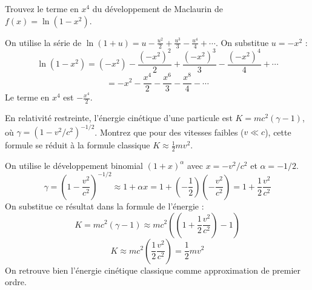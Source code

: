 \begin{exercicebox}
Trouvez le terme en $x^4$ du développement de Maclaurin de $f(x) = \ln(1-x^2)$.
\end{exercicebox}

\begin{correctionbox}
On utilise la série de $\ln(1+u) = u - \frac{u^2}{2} + \frac{u^3}{3} - \frac{u^4}{4} + \cdots$.
On substitue $u = -x^2$ :
$$ \ln(1-x^2) = (-x^2) - \frac{(-x^2)^2}{2} + \frac{(-x^2)^3}{3} - \frac{(-x^2)^4}{4} + \cdots $$
$$ = -x^2 - \frac{x^4}{2} - \frac{x^6}{3} - \frac{x^8}{4} - \cdots $$
Le terme en $x^4$ est $-\frac{x^4}{2}$.
\end{correctionbox}

\begin{exercicebox}
En relativité restreinte, l'énergie cinétique d'une particule est $K = mc^2(\gamma - 1)$, où $\gamma = (1-v^2/c^2)^{-1/2}$. Montrez que pour des vitesses faibles ($v \ll c$), cette formule se réduit à la formule classique $K \approx \frac{1}{2}mv^2$.
\end{exercicebox}

\begin{correctionbox}
On utilise le développement binomial $(1+x)^\alpha$ avec $x = -v^2/c^2$ et $\alpha = -1/2$.
$$ \gamma = \left(1 - \frac{v^2}{c^2}\right)^{-1/2} \approx 1 + \alpha x = 1 + \left(-\frac{1}{2}\right)\left(-\frac{v^2}{c^2}\right) = 1 + \frac{1}{2}\frac{v^2}{c^2} $$
On substitue ce résultat dans la formule de l'énergie :
$$ K = mc^2(\gamma - 1) \approx mc^2 \left( \left(1 + \frac{1}{2}\frac{v^2}{c^2}\right) - 1 \right) $$
$$ K \approx mc^2 \left( \frac{1}{2}\frac{v^2}{c^2} \right) = \frac{1}{2}mv^2 $$
On retrouve bien l'énergie cinétique classique comme approximation de premier ordre.
\end{correctionbox}